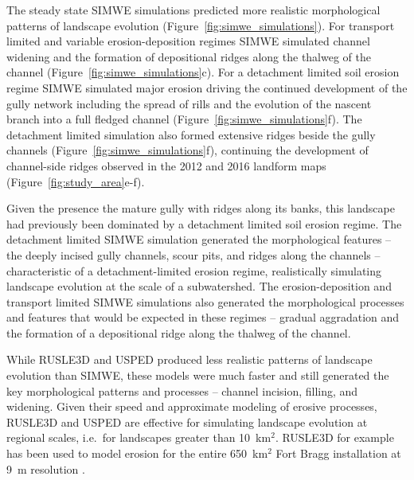 \documentclass[gmd, manuscript]{copernicus}
\begin{document}
The steady state SIMWE simulations 
predicted more realistic morphological patterns 
of landscape evolution
(Figure~\ref{fig:simwe_simulations}). 
%
For transport limited and
variable erosion-deposition regimes
SIMWE simulated
channel widening 
and the formation of depositional ridges
along the thalweg of the channel
(Figure~\ref{fig:simwe_simulations}c).
%
For a detachment limited soil erosion regime
SIMWE simulated major erosion
driving the continued development 
of the gully network
including the spread of rills and
the evolution of the nascent branch
into a full fledged channel
(Figure~\ref{fig:simwe_simulations}f). 
%
The detachment limited simulation
also formed extensive ridges
beside the gully channels 
(Figure~\ref{fig:simwe_simulations}f), 
continuing the development of 
channel-side ridges
observed in the 2012 and 2016 landform maps
(Figure~\ref{fig:study_area}e-f). 

Given the presence the mature gully 
with ridges along its banks,
this landscape had previously been dominated by 
a detachment limited soil erosion regime.
%
The detachment limited SIMWE simulation 
generated the morphological features
-- the deeply incised gully channels, 
scour pits,
and ridges along the channels 
--
characteristic of a detachment-limited erosion regime,
realistically simulating landscape evolution 
at the scale of a subwatershed. 
%
The erosion-deposition and transport limited 
SIMWE simulations also generated 
the morphological processes and features
that would be expected in these regimes
-- gradual aggradation
and the formation of a depositional ridge 
along the thalweg of the channel.

While RUSLE3D and USPED
produced less realistic patterns of landscape evolution
than SIMWE,
these models were much faster and still generated
the key morphological patterns and processes -- 
channel incision, filling, and widening. 
%
Given their speed
and approximate modeling of erosive processes, 
RUSLE3D and USPED 
are effective for simulating landscape evolution
at regional scales, 
i.e.~for landscapes greater than 10~\unit{km}$^{2}$. 
%
RUSLE3D for example has been used to
model erosion for the entire 650~\unit{km}$^{2}$ 
Fort Bragg installation at 9~\unit{m} resolution
\citep{Levine2018}. 



\end{document}
